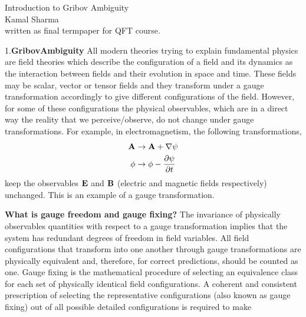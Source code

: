 \begin{description}
\begin{center}
{\large Introduction to Gribov Ambiguity} \\Kamal Sharma\\written as final termpaper for QFT course.\\
\end{center}
1.\textbf{GribovAmbiguity}
All modern theories trying to explain fundamental physics are field theories which describe the configuration of a field and its dynamics as the interaction between fields and their evolution in space and time. These fields may be scalar, vector or tensor fields and they transform under a gauge transformation accordingly to give different configurations of the field. However, for some of these configurations the physical observables, which are in a direct way the reality that we perceive/observe, do not change under gauge transformations. For example, in electromagnetism, the following transformations,
\begin{subequations}\begin{align}
 \bold{A} &\rightarrow \bold{A} + \nabla \psi  \\
 \phi &\rightarrow \phi - \frac{\partial \psi}{\partial t}\end{align} \end{subequations}
keep the observables $\bold{E}$ and $\bold{B}$ (electric and magnetic fields respectively) unchanged. This is an example of a gauge transformation.

\textbf{What is gauge freedom and gauge fixing?}
The invariance of physically observables quantities with respect to a gauge transformation implies that the system has redundant degrees of freedom in field variables. All field configurations that transform into one another through gauge transformations are physically equivalent and, therefore, for correct predictions, should be counted as one. Gauge fixing is the mathematical procedure of selecting an equivalence class for each set of physically identical field configurations. A coherent and consistent prescription of selecting the representative configurations (also known as gauge fixing) out of all possible detailed configurations is required to make





\end{description}

